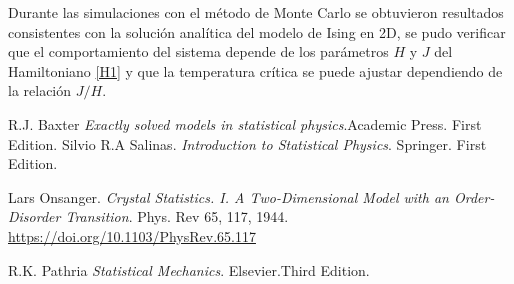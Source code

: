 \documentclass[a4paper]{article}
\begin{document}
Durante las simulaciones con el método de Monte Carlo se obtuvieron resultados consistentes con la solución analítica del modelo de Ising en 2D, se pudo verificar que el comportamiento del sistema depende de los parámetros $H$ y $J$ del Hamiltoniano \ref{H1} y que la temperatura crítica se puede ajustar dependiendo de la relación $J/H$.
\begin{thebibliography}{99}


R.J. Baxter \textit{Exactly solved models in statistical physics}.Academic Press. First Edition.
Silvio R.A Salinas. \textit{Introduction to Statistical Physics}. Springer. First Edition.

 Lars Onsanger. \textit{Crystal Statistics. I. A Two-Dimensional Model with an Order-Disorder Transition}. Phys. Rev 65, 117, 1944. \url{https://doi.org/10.1103/PhysRev.65.117}

R.K. Pathria \textit{Statistical Mechanics}. Elsevier.Third Edition.






\end{thebibliography}
\end{document}
